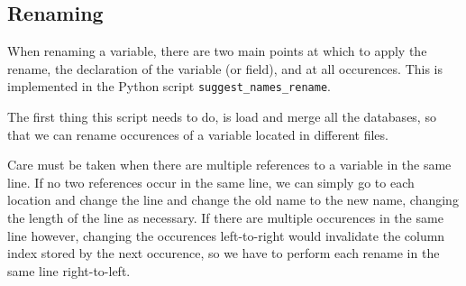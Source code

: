 \subsection{Renaming}

When renaming a variable, there are two main points at which to apply the
rename, the declaration of the variable (or field), and at all occurences.
This is implemented in the Python script \lstinline|suggest_names_rename|.

The first thing this script needs to do, is load and merge all the databases,
so that we can rename occurences of a variable located in different files.

Care must be taken when there are multiple references to a variable in the same
line. If no two references occur in the same line, we can simply go to each
location and change the line and change the old name to the new name, changing
the length of the line as necessary. If there are multiple occurences in the
same line however, changing the occurences left-to-right would invalidate the
column index stored by the next occurence, so we have to perform each rename in
the same line right-to-left.
